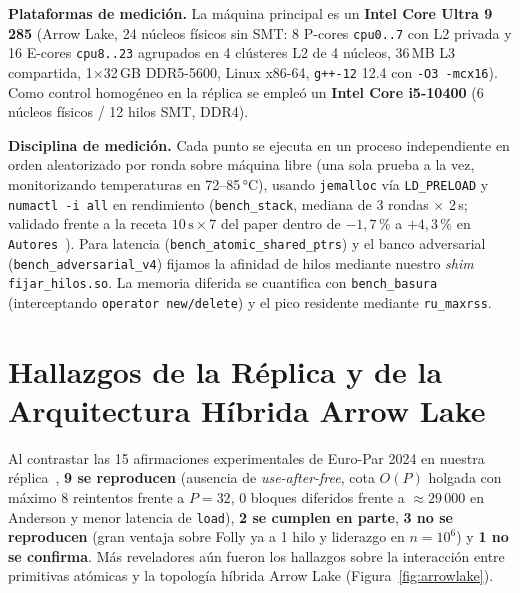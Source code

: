 \documentclass[10pt,twocolumn,a4paper]{article}
\begin{document}
\textbf{Plataformas de medición.} La máquina principal es un \textbf{Intel Core Ultra 9 285} (Arrow Lake, 24 núcleos físicos sin SMT: 8 P-cores \texttt{cpu0..7} con L2 privada y 16 E-cores \texttt{cpu8..23} agrupados en 4 clústeres L2 de 4 núcleos, 36\,MB L3 compartida, 1$\times$32\,GB DDR5-5600, Linux x86-64, \texttt{g++-12} 12.4 con \texttt{-O3 -mcx16}). Como control homogéneo en la réplica se empleó un \textbf{Intel Core i5-10400} (6 núcleos físicos / 12 hilos SMT, DDR4).

\textbf{Disciplina de medición.} Cada punto se ejecuta en un proceso independiente en orden aleatorizado por ronda sobre máquina libre (una sola prueba a la vez, monitorizando temperaturas en 72--85\,°C), usando \texttt{jemalloc} vía \texttt{LD\_PRELOAD} y \texttt{numactl -i all} en rendimiento (\texttt{bench\_stack}, mediana de 3 rondas $\times$ 2\,s; validado frente a la receta $10\,\text{s}\times 7$ del paper dentro de $-1{,}7\,\%$ a $+4{,}3\,\%$ en \texttt{Autores}~\cite{replica2026ultra9}). Para latencia (\texttt{bench\_atomic\_shared\_ptrs}) y el banco adversarial (\texttt{bench\_adversarial\_v4}) fijamos la afinidad de hilos mediante nuestro \emph{shim} \texttt{fijar\_hilos.so}. La memoria diferida se cuantifica con \texttt{bench\_basura} (interceptando \texttt{operator new/delete}) y el pico residente mediante \texttt{ru\_maxrss}.

\section{Hallazgos de la Réplica y de la Arquitectura Híbrida Arrow Lake}

Al contrastar las 15 afirmaciones experimentales de Euro-Par 2024 en nuestra réplica~\cite{replica2026ultra9}, \textbf{9 se reproducen} (ausencia de \emph{use-after-free}, cota $O(P)$ holgada con máximo 8 reintentos frente a $P=32$, 0 bloques diferidos frente a $\approx 29\,000$ en Anderson y menor latencia de \texttt{load}), \textbf{2 se cumplen en parte}, \textbf{3 no se reproducen} (gran ventaja sobre Folly ya a 1 hilo y liderazgo en $n=10^6$) y \textbf{1 no se confirma}. Más reveladores aún fueron los hallazgos sobre la interacción entre primitivas atómicas y la topología híbrida Arrow Lake (Figura~\ref{fig:arrowlake}).
\end{document}
